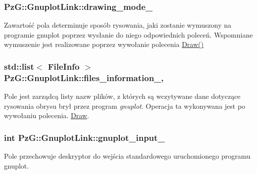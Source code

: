 \subsubsection[{\texorpdfstring{drawing\+\_\+mode\+\_\+}{drawing_mode_}}]{ Pz\+G\+::\+Gnuplot\+Link\+::drawing\+\_\+mode\+\_\+\hspace{0.3cm}{\ttfamily [protected]}}\hypertarget{class_pz_g_1_1_gnuplot_link_afe3cae0470049aee3c7350f488a630b6}{}\label{class_pz_g_1_1_gnuplot_link_afe3cae0470049aee3c7350f488a630b6}
Zawartość pola determinuje sposób rysowania, jaki zostanie wymuszony na programie {\ttfamily gnuplot} poprzez wysłanie do niego odpowiednich poleceń. Wspomniane wymuszenie jest realizowane poprzez wywołanie polecenia \hyperlink{class_pz_g_1_1_gnuplot_link_a96321ba10f7ee9c5f55dd17a28143a39}{Draw()} 
\subsubsection[{\texorpdfstring{files\+\_\+information\+\_\+}{files_information_}}]{\setlength{\rightskip}{0pt plus 5cm}std\+::list$<$ {\bf File\+Info} $>$ Pz\+G\+::\+Gnuplot\+Link\+::files\+\_\+information\+\_\+\hspace{0.3cm}{\ttfamily [static]}, {\ttfamily [protected]}}\hypertarget{class_pz_g_1_1_gnuplot_link_af4b03524d7d1ccb3f09524217048ef5d}{}\label{class_pz_g_1_1_gnuplot_link_af4b03524d7d1ccb3f09524217048ef5d}
Pole jest zarządcą listy nazw plików, z których są wczytywane dane dotyczące rysowania obrysu brył przez program {\itshape gnuplot}. Operacja ta wykonywana jest po wywołaniu polecenia. \hyperlink{class_pz_g_1_1_gnuplot_link_a96321ba10f7ee9c5f55dd17a28143a39}{Draw}. 
\subsubsection[{\texorpdfstring{gnuplot\+\_\+input\+\_\+}{gnuplot_input_}}]{\setlength{\rightskip}{0pt plus 5cm}int Pz\+G\+::\+Gnuplot\+Link\+::gnuplot\+\_\+input\+\_\+\hspace{0.3cm}{\ttfamily [protected]}}\hypertarget{class_pz_g_1_1_gnuplot_link_a8b04a557aacb13f62a46bd0cd1233119}{}\label{class_pz_g_1_1_gnuplot_link_a8b04a557aacb13f62a46bd0cd1233119}
Pole przechowuje deskryptor do wejścia standardowego uruchomionego programu gnuplot. 
